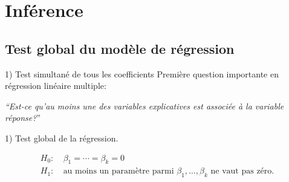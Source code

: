 \documentclass{BeamerTemplate}
\begin{document}
\section{Inférence}

\subsection{Test global du modèle de régression}

\begin{frame}[t]{1) Test simultané de tous les coefficients}
Première question importante en régression linéaire multiple:
\bigskip

\begin{center}
\textit{``Est-ce  qu'au moins une des variables explicatives est associée à la variable réponse?}''
\end{center}

\alert{1) Test global de la régression}.

\begin{align*}
H_0:&~\beta_1=\cdots=\beta_k=0\\
H_1:&~\text{au moins un paramètre parmi\ }\beta_1,\ldots,\beta_k\text{\  ne vaut pas zéro.}
\end{align*}
\end{frame}
\end{document}
